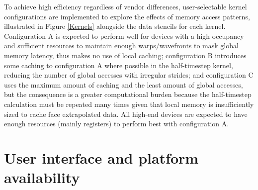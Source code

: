 To achieve high efficiency regardless of vendor differences, user-selectable kernel configurations are implemented to explore the effects of memory access patterns, illustrated in Figure \ref{Kernels} alongside the data stencils for each kernel. Configuration A is expected to perform well for devices with a high occupancy and sufficient resources to maintain enough warps/wavefronts to mask global memory latency, thus makes no use of local caching; configuration B introduces some caching to configuration A where possible in the half-timestep kernel, reducing the number of global accesses with irregular strides; and configuration C uses the maximum amount of caching and the least amount of global accesses, but the consequence is a greater computational burden because the half-timestep calculation must be repeated many times given that local memory is insufficiently sized to cache face extrapolated data. All high-end devices are expected to have enough resources (mainly registers) to perform best with configuration A. 

\section{User interface and platform availability}

